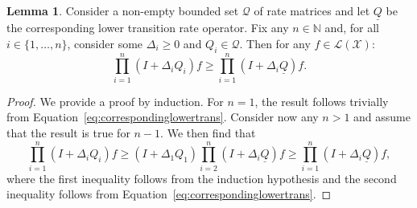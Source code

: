\documentclass[10pt,a4paper]{paper}
\theoremstyle{definition}
\newtheorem{lemma}[theorem]{Lemma}
\newcommand{\nats}{\mathbb{N}}
\newcommand{\states}{\mathcal{X}}
\newcommand{\gambles}{\mathcal{L}}
\newcommand{\gamblesX}{\gambles(\states)}
\newcommand{\rateset}{\mathcal{Q}}
\newcommand{\lrate}{\underline{Q}}
\begin{document}
\begin{lemma}\label{lemma:productofQsdominatesproductoflrates}
Consider a non-empty bounded set $\rateset$ of rate matrices and let $\lrate$ be the corresponding lower transition rate operator. Fix any $n\in\nats$ and, for all $i\in\{1,\dots,n\}$, consider some $\Delta_i\geq0$ and $Q_i\in\rateset$. Then for any $f\in\gamblesX$:
\begin{equation*}
\prod_{i=1}^n(I+\Delta_iQ_i)f
\geq
\prod_{i=1}^n(I+\Delta_i\lrate)f.
\end{equation*}
\end{lemma}
\begin{proof}
We provide a proof by induction. For $n=1$, the result follows trivially from Equation~\eqref{eq:correspondinglowertrans}. Consider now any $n>1$ and assume that the result is true for $n-1$. We then find that
\begin{equation*}
\prod_{i=1}^n(I+\Delta_iQ_i)f
\geq
(I+\Delta_1Q_1)\prod_{i=2}^n(I+\Delta_i\lrate)f
\geq
\prod_{i=1}^n(I+\Delta_i\lrate)f,
\end{equation*}
where the first inequality follows from the induction hypothesis and the second inequality follows from Equation~\eqref{eq:correspondinglowertrans}.
\end{proof}
\end{document}
